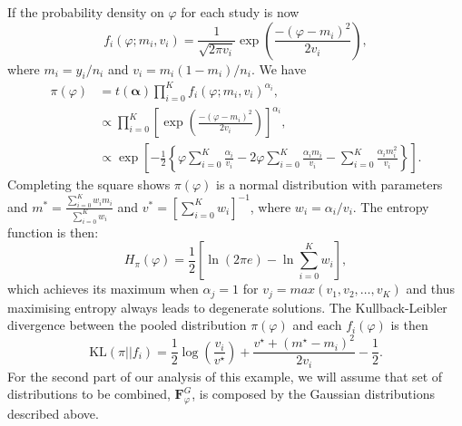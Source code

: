 \documentclass[a4paper, notitlepage, 10pt]{article}
\begin{document}
If the  probability density on $\varphi$ for each study is now
$$ f_i(\varphi; m_i, v_i) = \frac{1}{\sqrt{2\pi v_i}} \exp\left(\frac{-(\varphi-m_i)^2}{2v_i}\right), $$
where $m_i = y_i/n_i$ and $v_i = m_i(1-m_i)/n_i$.
We have
\begin{align}
\nonumber
\pi(\varphi)&= t(\boldsymbol\alpha)\prod_{i=0}^{K}f_i(\varphi; m_i, v_i)^{\alpha_i},\\
\nonumber
&\propto \prod_{i=0}^{K} \left[ \exp\left(\frac{-(\varphi-m_i)^2}{2v_i}\right) \right]^{\alpha_i},\\
&\propto \exp\left[-\frac{1}{2}\left\{\varphi\sum_{i=0}^K\frac{\alpha_i}{v_i} - 2\varphi\sum_{i=0}^K \frac{\alpha_im_i}{v_i} - \sum_{i=0}^K\frac{\alpha_im_i^2}{v_i} \right\}\right].
\end{align}
Completing the square shows $\pi(\varphi)$ is a normal distribution with parameters and $m^* = \frac{\sum_{i=0}^K w_im_i}{\sum_{i=0}^K w_i}$ and $v^* = [\sum_{i=0}^K w_i]^{-1}$,  where $w_i = \alpha_i/v_i$.
The entropy function is then:
\begin{equation}
 \label{eq:normalpoolentropy}
 H_{\pi}(\varphi) = \frac{1}{2}\left[ \ln(2\pi e) - \ln\sum_{i=0}^K w_i\right],
\end{equation}
which achieves its maximum when $\alpha_j = 1$ for $v_j = max(v_1, v_2, \ldots, v_K)$ and thus maximising entropy always leads to degenerate solutions.
The Kullback-Leibler divergence between the pooled distribution $\pi(\varphi)$ and each $f_i(\varphi)$ is then
\begin{equation}
 \label{eq:KL_Gaussian}
 \text{KL}( \pi || f_i) = \frac{1}{2}\log\left(\frac{v_i}{v^\star}\right) + \frac{v^\star + (m^\star - m_i)^2}{2v_i} - \frac{1}{2}.
\end{equation}
For the second part of our analysis of this example, we will assume that set of distributions to be combined, $\boldsymbol F^{G}_\varphi$, is composed by the Gaussian distributions described above.
\end{document}

